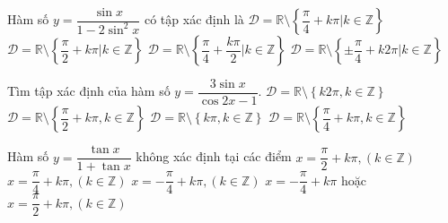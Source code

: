 \begin{ex}%
	Hàm  số $y=\dfrac{\sin x}{1-2\sin^2x}$ có tập xác định là
	\choice 
		 {$\mathscr{D}=\mathbb{R}\setminus\left\{\dfrac{\pi}{4}+k\pi\Big|k\in\mathbb{Z}\right\}$}
		{$\mathscr{D}=\mathbb{R}\setminus\left\{\dfrac{\pi}{2}+k\pi\Big|k\in\mathbb{Z}\right\}$} 
		 {\True $\mathscr{D}=\mathbb{R}\setminus\left\{\dfrac{\pi}{4}+\dfrac{k\pi}{2}\Big|k\in\mathbb{Z}\right\}$}
		{$\mathscr{D}=\mathbb{R}\setminus\left\{\pm\dfrac{\pi}{4}+k2\pi\Big|k\in\mathbb{Z}\right\}$} 
\end{ex}

\begin{ex}%
	Tìm tập xác  định của hàm số $y=\dfrac{3\sin x}{\cos 2x-1}$.
	\choice 
		{$\mathscr{D}=\mathbb{R}\setminus  \left\{k2\pi, k\in \mathbb{Z}\right\}$}
		{$\mathscr{D}=\mathbb{R}\setminus \left\{\dfrac{\pi}{2}+k\pi, k\in  \mathbb{Z}\right\}$}
		{\True  $\mathscr{D}=\mathbb{R}\setminus \left\{k\pi, k\in \mathbb{Z}\right\}$}
		{$\mathscr{D}=\mathbb{R}\setminus \left\{\dfrac{\pi}{4}+k\pi, k\in \mathbb{Z}\right\}$} 
\end{ex}

\begin{ex}%
	Hàm số $ y=\dfrac{\tan x}{1+\tan x}$ không xác định tại các điểm 
	 \choice
		{$  x=\dfrac{\pi}{2}+k\pi, (k\in\mathbb{Z})$}
		{$ x=\dfrac{\pi}{4}+k\pi, (k\in\mathbb{Z})$} 
		{$ x=-\dfrac{\pi}{4}+k\pi, (k\in\mathbb{Z})$} 
		 {\True $ x=-\dfrac{\pi}{4}+k\pi$ hoặc $x=\dfrac{\pi}{2}+k\pi, (k\in\mathbb{Z})$}
\end{ex}

